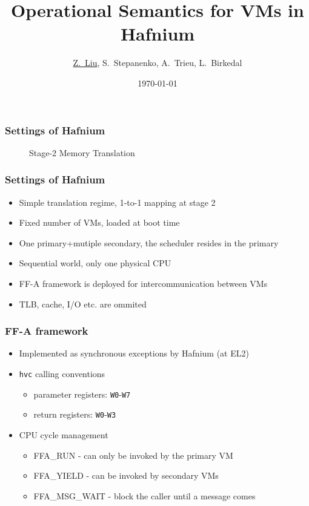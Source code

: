 \documentclass{beamer}
\title{Operational Semantics for VMs in Hafnium}
\institute{Aarhus University}
\date{\today}
\author[Liu, Stepanenko, Trieu, Birkedal]
{\underline{Z.~Liu}, S.~Stepanenko, A.~Trieu, L.~Birkedal}
\institute[Aarhus]
{
  Department of Computer Science\\
  Aarhus University
}
\begin{document}
\frame{\titlepage}



\begin{frame}
  \frametitle{Settings of Hafnium}
  \begin{figure}

\caption{Stage-2 Memory Translation}
\end{figure}
\end{frame}

\begin{frame}
  \frametitle{Settings of Hafnium}
  \begin{itemize}
    \item Simple translation regime, 1-to-1 mapping at stage 2
    \item Fixed number of VMs, loaded at boot time
    \item One primary+mutiple secondary, the scheduler resides in the primary
    \item Sequential world, only one physical CPU
    \item FF-A framework is deployed for intercommunication between VMs
    \item TLB, cache, I/O etc. are ommited
  \end{itemize}
\end{frame}

\begin{frame}
  \frametitle{FF-A framework}
  \begin{itemize}
    \item Implemented as synchronous exceptions by Hafnium (at EL2)
    \item \texttt{hvc} calling conventions
      \begin{itemize}
        \item parameter registers: \texttt{W0}-\texttt{W7}
          \item return registers: \texttt{W0}-\texttt{W3}
          \end{itemize}
    \item CPU cycle management
      \begin{itemize}
        \item FFA\_RUN - can only be invoked by the primary VM
        \item FFA\_YIELD - can be invoked by secondary VMs
        \item FFA\_MSG\_WAIT - block the caller until a message comes
      \end{itemize}

  \end{itemize}
\end{frame}
\end{document}
